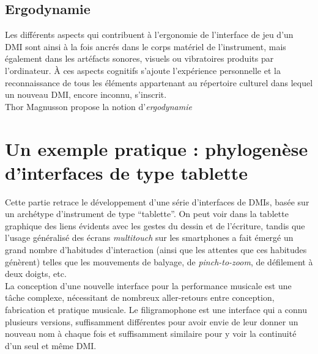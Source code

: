 \subsection{Ergodynamie}

\noindent Les différents aspects qui contribuent à l'ergonomie de l'interface de jeu d'un \gls{DMI} sont ainsi à la fois ancrés dans le corps matériel de l'instrument, mais également dans les artéfacts sonores, visuels ou vibratoires produits par l'ordinateur. À ces aspects cognitifs s'ajoute l'expérience personnelle et la reconnaissance de tous les éléments appartenant au répertoire culturel dans lequel un nouveau \gls{DMI}, encore inconnu, s'inscrit.\\
\indent Thor Magnusson propose la notion d'\textit{ergodynamie} 


\section{Un exemple pratique : phylogenèse d'interfaces de type tablette}
\label{sec:interfaces:phylogenese}

\noindent Cette partie retrace le développement d'une série d'interfaces de \glspl{DMI}, basée sur un archétype d'instrument de type ``tablette''. On peut voir dans la tablette graphique des liens évidents avec les gestes du dessin et de l'écriture, tandis que l'usage généralisé des écrans \textit{multitouch} sur les smartphones a fait émergé un grand nombre d'habitudes d'interaction (ainsi que les attentes que ces habitudes génèrent) telles que les mouvements de balyage, de \textit{pinch-to-zoom}, de défilement à deux doigts, etc.\\
\indent La conception d’une nouvelle interface pour la performance musicale est une tâche complexe, nécessitant de nombreux aller-retours entre conception, fabrication et pratique musicale. Le filigramophone est une interface qui a connu plusieurs versions, suffisamment différentes pour avoir envie de leur donner un nouveau nom à chaque fois et suffisamment similaire pour y voir la continuité d’un seul et même \gls{DMI}.

